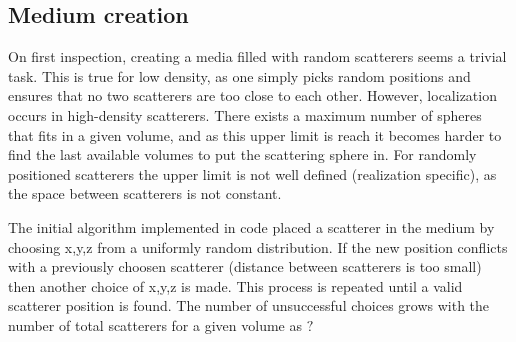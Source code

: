 \newpage
\subsection {Medium creation}
On first inspection, creating a media filled with random scatterers
seems a trivial task.  This is true for low density, as one simply
picks random positions and ensures that no two scatterers are too
close to each other.  However, localization occurs in high-density
scatterers.  There exists a maximum number of spheres that fits in a 
given volume, and as this upper limit is reach it becomes harder
to find the last available volumes to put the scattering sphere in.
For randomly positioned scatterers the upper limit is not well 
defined (realization specific), as the space between scatterers is not constant.

The initial algorithm implemented in code placed a scatterer in the medium by
choosing x,y,z from a uniformly random distribution. If the new position
conflicts with a previously choosen scatterer (distance between scatterers
is too small) then another choice of x,y,z is made. This process is repeated
until a valid scatterer position is found.  The number of unsuccessful 
choices grows with the number of total scatterers for a given volume as
$ ? $

